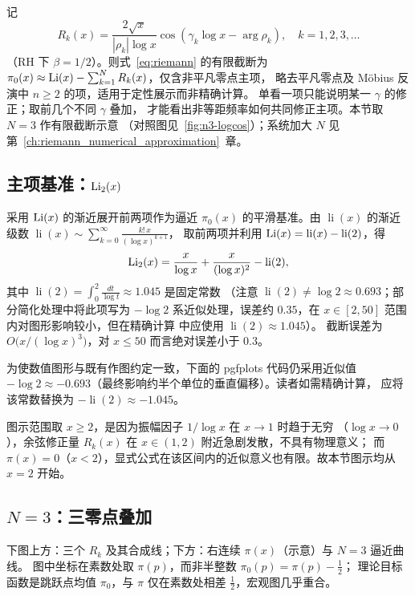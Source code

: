 记
\begin{equation}
R_k(x)=\frac{2\sqrt{x}}{|\rho_k|\log x}\cos(\gamma_k\log x-\arg\rho_k),
\quad k=1,2,3,\ldots
\label{eq:Rk}
\end{equation}
（RH 下 $\beta=1/2$）。则式~\eqref{eq:riemann} 的有限截断为
$\pi_0(x)\approx\operatorname{Li}(x)-\sum_{k=1}^{N}R_k(x)$，仅含非平凡零点主项，
略去平凡零点及 M\"obius 反演中 $n\ge 2$ 的项，适用于定性展示而非精确计算。
单看一项只能说明某一 $\gamma$ 的修正；取前几个不同 $\gamma$ 叠加，
才能看出非等距频率如何共同修正主项。本节取 $N=3$ 作有限截断示意
（对照图见~\ref{fig:n3-logcos}）；系统加大 $N$ 见第~\ref{ch:riemann_numerical_approximation}~章。

\subsection{主项基准：\texorpdfstring{$\operatorname{Li}_2(x)$}{Li2(x)}}

采用 $\operatorname{Li}(x)$ 的渐近展开前两项作为逼近 $\pi_0(x)$ 的平滑基准。由
$\operatorname{li}(x)$ 的渐近级数
$\operatorname{li}(x)\sim\sum_{k=0}^{\infty}\frac{k!\,x}{(\log x)^{k+1}}$，
取前两项并利用 $\operatorname{Li}(x)=\operatorname{li}(x)-\operatorname{li}(2)$，得
\[
\operatorname{Li}_2(x)=\frac{x}{\log x}+\frac{x}{(\log x)^2}-\operatorname{li}(2),
\]
其中 $\operatorname{li}(2)=\int_0^2\frac{dt}{\log t}\approx 1.045$ 是固定常数
（注意 $\operatorname{li}(2)\neq\log 2\approx 0.693$；部分简化处理中将此项写为 $-\log 2$
系近似处理，误差约 $0.35$，在 $x\in[2,50]$ 范围内对图形影响较小，但在精确计算
中应使用 $\operatorname{li}(2)\approx 1.045$）。
截断误差为 $O\!\bigl(x/(\log x)^3\bigr)$，对 $x\le 50$ 而言绝对误差小于 $0.3$。

为使数值图形与既有作图约定一致，下面的 pgfplots 代码仍采用近似值
$-\log 2\approx -0.693$（最终影响约半个单位的垂直偏移）。读者如需精确计算，
应将该常数替换为 $-\operatorname{li}(2)\approx -1.045$。

图示范围取 $x\ge 2$，是因为振幅因子 $1/\log x$ 在 $x\to 1$ 时趋于无穷
（$\log x\to 0$），余弦修正量 $R_k(x)$ 在 $x\in(1,2)$ 附近急剧发散，不具有物理意义；
而 $\pi(x)=0$（$x<2$），显式公式在该区间内的近似意义也有限。故本节图示均从 $x=2$ 开始。

\subsection{\texorpdfstring{$N=3$}{N=3}：三零点叠加}

下图上方：三个 $R_k$ 及其合成线；下方：右连续 $\pi(x)$（示意）与 $N=3$ 逼近曲线。
图中坐标在素数处取 $\pi(p)$，而非半整数 $\pi_0(p)=\pi(p)-\frac12$；
理论目标函数是跳跃点均值 $\pi_0$，与 $\pi$ 仅在素数处相差 $\frac12$，宏观图几乎重合。

